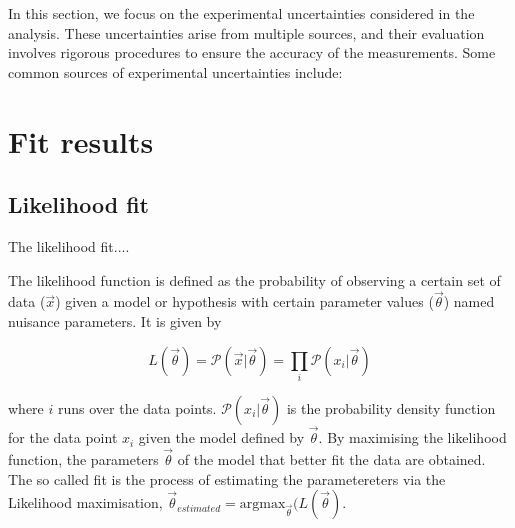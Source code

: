 In this section, we focus on the experimental uncertainties considered in the analysis. These 
uncertainties arise from multiple sources, and their evaluation involves rigorous procedures to ensure 
the accuracy of the measurements. Some common sources of experimental uncertainties include:



\section{Fit results}
\label{sec:ChaptH:Fit}



\subsection{Likelihood fit} %
The likelihood fit....

The likelihood function is defined as the probability of observing a certain set of data 
($\overrightarrow{x}$) given a model or hypothesis with certain parameter values 
($\overrightarrow{\theta}$) named nuisance parameters. It is given by

\begin{minipage}[t]{0.6\textwidth}
\begin{equation*}
	L(\overrightarrow{\theta}) = \mathcal{P}(\overrightarrow{x}|\overrightarrow{\theta}) 
	= \prod_{i} \mathcal{P}(x_{i}|\overrightarrow{\theta})
\end{equation*}
\end{minipage}\hfill
\begin{minipage}[t]{0.3\textwidth}
  \centering{}
\end{minipage}
where $i$ runs over the data points. 
$\mathcal{P}(x_{i}|\overrightarrow{\theta})$ is the probability density function for 
the data point $x_{i}$ given the model defined by $\overrightarrow{\theta}$.
By maximising the likelihood function, the parameters $\overrightarrow{\theta}$ of the model that
better fit the data are obtained. The so called fit is the process of estimating the parametereters
via the Likelihood maximisation, 
$\overrightarrow{\theta}_{estimated} = \text{argmax}_{\overrightarrow{\theta}}(L(\overrightarrow{\theta})$.

